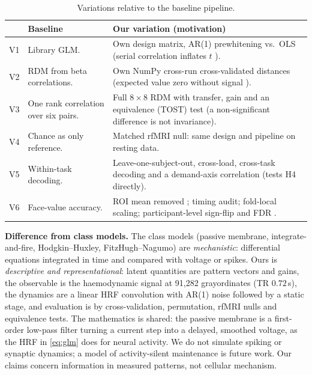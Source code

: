 \documentclass[conference]{IEEEtran}
\begin{document}
\begin{table}[!tb]
\caption{Variations relative to the baseline pipeline.}
\label{tab:variations}
\centering\footnotesize
\renewcommand{\arraystretch}{1.05}
\begin{tabular}{@{}p{0.45cm}p{2.0cm}p{5.5cm}@{}}
\toprule
 & \textbf{Baseline} & \textbf{Our variation (motivation)}\\
\midrule
V1 & Library GLM. & Own design matrix, AR(1) prewhitening vs.\ OLS (serial correlation inflates $t$ \cite{woolrich2001}).\\
V2 & RDM from beta correlations. & Own NumPy cross-run cross-validated distances (expected value zero without signal \cite{walther2016,nili2014}).\\
V3 & One rank correlation over six pairs. & Full $8\times8$ RDM with transfer, gain and an equivalence (TOST) test (a non-significant difference is not invariance).\\
V4 & Chance as only reference. & Matched rfMRI null: same design and pipeline on resting data.\\
V5 & Within-task decoding. & Leave-one-subject-out, cross-load, cross-task decoding and a demand-axis correlation (tests H4 directly).\\
V6 & Face-value accuracy. & ROI mean removed \cite{coutanche2013}; timing audit; fold-local scaling; participant-level sign-flip and FDR \cite{stelzer2013,nichols2002}.\\
\bottomrule
\end{tabular}
\end{table}

\textbf{Difference from class models.} The class models (passive membrane, integrate-and-fire, Hodgkin--Huxley, FitzHugh--Nagumo) are \emph{mechanistic}: differential equations integrated in time and compared with voltage or spikes. Ours is \emph{descriptive and representational}: latent quantities are pattern vectors and gains, the observable is the haemodynamic signal at 91{,}282 grayordinates (TR $0.72$\,s), the dynamics are a linear HRF convolution with AR(1) noise followed by a static stage, and evaluation is by cross-validation, permutation, rfMRI nulls and equivalence tests. The mathematics is shared: the passive membrane is a first-order low-pass filter turning a current step into a delayed, smoothed voltage, as the HRF in \eqref{eq:glm} does for neural activity. We do not simulate spiking or synaptic dynamics; a model of activity-silent maintenance is future work. Our claims concern information in measured patterns, not cellular mechanism.
\end{document}
